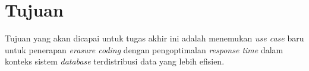 \section{Tujuan}

Tujuan yang akan dicapai untuk tugas akhir ini adalah menemukan \textit{use case} baru untuk penerapan \textit{erasure coding} dengan pengoptimalan \textit{response time} dalam konteks sistem \textit{database} terdistribusi data yang lebih efisien.
